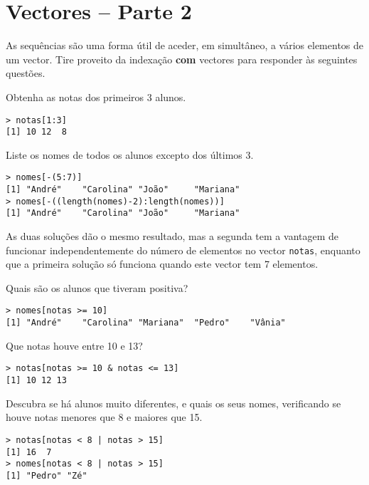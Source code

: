 \documentclass{exam}
\begin{document}
\section{Vectores -- Parte 2}
As sequências são uma forma útil de aceder, em simultâneo, a vários elementos de um vector. Tire proveito da indexação \textbf{com} vectores para responder às seguintes questões.
\begin{questions}
\question Obtenha as notas dos primeiros 3 alunos.
\begin{solution}
	\begin{verbatim}
> notas[1:3]
[1] 10 12  8
	\end{verbatim}
\end{solution}

\question Liste os nomes de todos os alunos excepto dos últimos 3.
\begin{solution}
	\begin{verbatim}
> nomes[-(5:7)]
[1] "André"    "Carolina" "João"     "Mariana" 
> nomes[-((length(nomes)-2):length(nomes))]
[1] "André"    "Carolina" "João"     "Mariana" 
	\end{verbatim}
	As duas soluções dão o mesmo resultado, mas a segunda tem a vantagem de funcionar independentemente do número de elementos no vector \texttt{notas}, enquanto que a primeira solução só funciona quando este vector tem 7 elementos.
\end{solution}

\question Quais são os alunos que tiveram positiva?
\begin{solution}
	\begin{verbatim}
> nomes[notas >= 10]
[1] "André"    "Carolina" "Mariana"  "Pedro"    "Vânia"   
	\end{verbatim}
\end{solution}

\question Que notas houve entre 10 e 13?
\begin{solution}
	\begin{verbatim}
> notas[notas >= 10 & notas <= 13]
[1] 10 12 13
	\end{verbatim}
\end{solution}

\question Descubra se há alunos muito diferentes, e quais os seus nomes, verificando se houve notas menores que 8 e maiores que 15.
\begin{solution}
	\begin{verbatim}
> notas[notas < 8 | notas > 15]
[1] 16  7
> nomes[notas < 8 | notas > 15]
[1] "Pedro" "Zé"   
	\end{verbatim}
\end{solution}


\end{questions}
\end{document}
